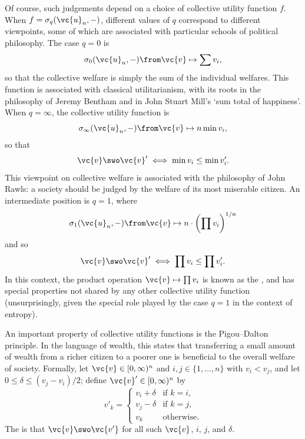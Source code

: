 \begin{example}
Of course, such judgements depend on a choice of collective utility
function $f$.  When $f = \sigma_q(\vc{u}_n, -)$, different values of $q$
correspond to different viewpoints, some of which are associated with
particular schools of political%
%
%
philosophy.%
% 
% 
The case $q = 0$ is
\[
\sigma_0(\vc{u}_n, -) \from 
\vc{v} \mapsto \sum v_i,
\]
so that the collective welfare is simply the sum of the individual welfares.
This function is associated with classical utilitarianism,%
% 
%
with its
roots in the philosophy of Jeremy Bentham%
% 
%
and in John Stuart Mill's%
% 
%
`sum total of happiness'.  When $q = \infty$, the collective utility
function is
\[
\sigma_\infty(\vc{u}_n, -) \from
\vc{v} \mapsto n \min v_i,
\]
so that
\[
\vc{v} \swo \vc{v}' \iff \min v_i \leq \min v'_i.
\]
This viewpoint on collective welfare is associated with the philosophy of
John Rawls:%
%
% 
a society should be judged by the welfare of its most
miserable citizen.  An intermediate position is $q = 1$, where
\[
\sigma_1(\vc{u}_n, -) \from 
\vc{v} \mapsto n \cdot \biggl( \prod v_i \biggr)^{1/n}
\]
and so
\[
\vc{v} \swo \vc{v}' \iff \prod v_i \leq \prod v'_i.
\]
In this context, the product operation $\vc{v} \mapsto \prod v_i$ is known
as the , and has special properties not shared by any
other collective utility function (unsurprisingly, given the special role
played by the case $q = 1$ in the context of entropy).

An important property of collective utility functions is the
Pigou--Dalton%
% 
% 
principle.  In the language of wealth, this states that transferring a
small amount of wealth from a richer citizen to a poorer one is beneficial
to the overall welfare of society.  Formally, let $\vc{v} \in [0,
  \infty)^n$ and $i, j \in \{1, \ldots, n\}$ with $v_i < v_j$, and let $0
  \leq \delta \leq (v_j - v_i)/2$; define $\vc{v}' \in [0, \infty)^n$ by
\[
v'_k =
\begin{cases}
v_i + \delta &\text{if } k = i,      \\
v_j - \delta &\text{if } k = j,      \\
v_k     &\text{otherwise}.
\end{cases}
\]
The  is that $\vc{v} \swo \vc{v'}$ for
all such $\vc{v}$, $i$, $j$, and $\delta$.


\end{example}
